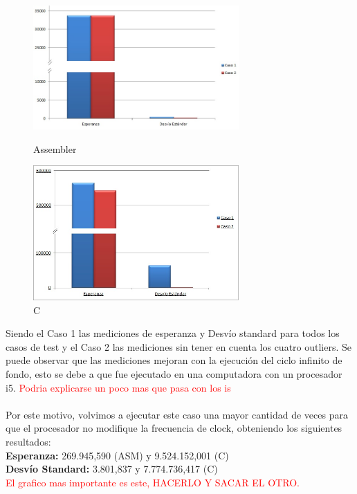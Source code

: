 \begin{figure}
  \begin{center}
	\includegraphics[width=0.7\textwidth]{imagenes/13/asm2.jpg}
	\caption{Assembler}
	\includegraphics[width=0.7\textwidth]{imagenes/13/C2.jpg}
	\caption{C}
  \end{center}
\end{figure}
\newpage
\indent Siendo el Caso 1 las mediciones de esperanza y Desvío standard para todos los casos de test y el Caso 2 las mediciones sin tener en cuenta los cuatro outliers. Se puede observar que las mediciones mejoran con la ejecuci\'on del ciclo infinito de fondo, esto se debe a que fue ejecutado en una computadora con un procesador i5. \textcolor{red}{Podria explicarse un poco mas que pasa con los is}\\
\\
\indent Por este motivo, volvimos a ejecutar este caso una mayor cantidad de veces para que el procesador no modifique la frecuencia de clock, obteniendo los siguientes resultados: \\
\textbf{Esperanza:} 269.945,590 (ASM) y 9.524.152,001 (C) \\
\textbf{Desv\'io Standard:} 3.801,837 y 7.774.736,417 (C) \\
\textcolor{red}{El grafico mas importante es este, HACERLO Y SACAR EL OTRO.}
\\
